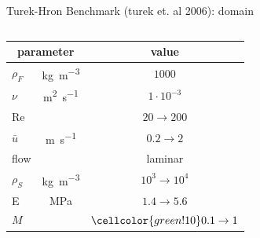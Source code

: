 \documentclass[10pt,t]{beamer}
\begin{document}
\begin{frame}{Turek-Hron  Benchmark (turek et. al 2006): domain}
\begin{columns}
		\vspace{0.5cm}
		\begin{tabular}{ l c  | c } 
			\multicolumn{2}{c|}{parameter} & value  \\ 
			\hline
			$\rho_F$ & \si{kg.m^{-3}} & \cellcolor{blue!20} $1000$   \\
			$\nu$& \si{m^2.s^{-1}} & \cellcolor{blue!20} $1 \cdot 10^{-3}$  \\
			Re &  & \cellcolor{blue!20} $20 \rightarrow 200$  \\
			$\bar{u}$ & \si{m.s^{-1}} & \cellcolor{blue!20} $0.2 \rightarrow 2 $ \\
			flow & & \cellcolor{blue!20} laminar \\
			\hline
			$\rho_S$ & \si{kg.m^{-3}} & \cellcolor{orange!50} $10^{3} \rightarrow 10^{4}$    \\
			E & \si{MPa} & \cellcolor{orange!50} $1.4 \rightarrow 5.6$    \\
			\hline
			$M$ & & $ \cellcolor{green!10} 0.1 \rightarrow 1$     \\

		\end{tabular}
\end{columns}

\end{frame}
\end{document}
